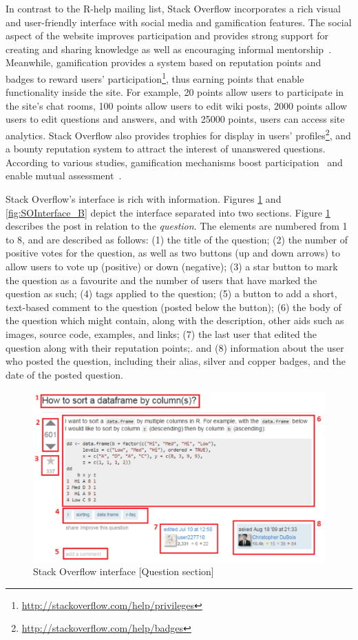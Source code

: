 \documentclass{sig-alternate-05-2015}
\begin{document}
	In contrast to the R-help mailing list, Stack Overflow incorporates a rich visual and user-friendly interface with social media and gamification features.
	The social aspect of the website improves participation and provides strong support for creating and sharing knowledge as well as encouraging informal mentorship~\cite{Jenkins2009, Storey2014}.
	Meanwhile, gamification provides a system based on reputation points and badges to reward users' participation\footnote{\url{http://stackoverflow.com/help/privileges}}, thus earning points that enable functionality inside the site.
	For example, 20 points allow users to participate in the site's chat rooms, 100 points allow users to edit wiki posts, 2000 points allow users to edit questions and answers, and with 25000 points, users can access site analytics.
	Stack Overflow also provides trophies for display in users' profiles\footnote{\url{http://stackoverflow.com/help/badges}}, and a bounty reputation system to attract the interest of unanswered questions.
	According to various studies, gamification mechanisms boost participation~\cite{Vasilescu2014} and enable mutual assessment~\cite{Singer2013}.

	Stack Overflow's interface is rich with information. Figures \ref{fig:SOInterface_A} and \ref{fig:SOInterface_B} depict the interface separated into two sections. Figure \ref{fig:SOInterface_A} describes the post in relation to the \textit{question}. 
	The elements are numbered from 1 to 8, and are described as follows:
	(1) the title of the question;
	(2) the number of positive votes for the question, as well as two buttons (up and down arrows) to allow users to vote up (positive) or down (negative);
	(3) a star button to mark the question as a favourite and the number of users that have marked the question as such;
	(4) tags applied to the question;
	(5) a button to add a short, text-based comment to the question (posted below the button);
	(6) the body of the question which might contain, along with the description, other aids such as images, source code, examples, and links;
	(7) the last user that edited the question along with their reputation points;.
	and (8) information about the user who posted the question, including their alias, silver and copper badges, and the date of the posted question.

	\begin{figure}[!htb]
	\centering
	\includegraphics[width=0.8\columnwidth]{Figures/SOInterface_A}
	\caption{Stack Overflow interface [Question section]}
	\label{fig:SOInterface_A}
	\end{figure}
\end{document}
